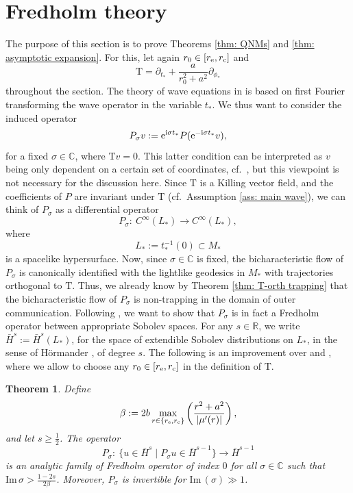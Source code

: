 \documentclass[10pt,a4paper]{amsart}
\renewcommand{\Im}{\mathrm{Im} \,}
\renewcommand{\b}{\beta}
\renewcommand{\d}{\partial}
\newcommand{\abs}[1]{\left\lvert#1\right\rvert}
\newcommand{\T}{\mathrm T}
\newcommand{\s}{\sigma}
\newcommand{\R}[0]{\mathbb{R}}
\newcommand{\C}[0]{\mathbb{C}}
\numberwithin{equation}{section}
\newtheorem{Theorem}{Theorem}[section]
\begin{document}
\section{Fredholm theory}


The purpose of this section is to prove Theorems \ref{thm: QNMs} and \ref{thm: asymptotic expansion}.
For this, let again $r_0 \in [r_{\rm e}, r_{\rm c}]$
and
\[
	\T
		= \d_{t_*} + \frac a{r_0^2 + a^2} \d_{\phi_*}
\]
throughout the section.
The theory of wave equations in \cite{V2013} is based on first Fourier transforming the wave operator in the variable $t_*$.
We thus want to consider the induced operator
\[
	P_\s v
		:= {\rm e}^{{\rm i}\s t_*} P({\rm e}^{-{\rm i} \s t_*} v),
\]
for a fixed $\s \in \C$, where
$\T v
		= 0$.
This latter condition can be interpreted as $v$ being only dependent on a certain set of coordinates, cf.\ \cite[equation~(11)]{PV2023}, but this viewpoint is not necessary for the discussion here.
Since $\T$ is a Killing vector field, and the coefficients of $P$ are invariant under $\T$ (cf.~Assumption \ref{ass: main wave}), we can think of $P_\s$ as a differential operator
\[
	P_\s
		\colon\
 C^\infty(L_*) \to C^\infty(L_*),
\]
where
\[
	L_*
		:= t_*^{-1}(0) \subset M_*
\]
is a spacelike hypersurface.
Now, since $\s \in \C$ is fixed, the bicharacteristic flow of $P_\s$ is canonically identified with the lightlike geodesics in $M_*$ with trajectories orthogonal to $\T$.
Thus, we already know by Theorem \ref{thm: T-orth trapping} that the bicharacteristic flow of $P_\s$ is non-trapping in the domain of outer communication.
Following \cite{V2013}, we want to show that $P_\s$ is in fact a Fredholm operator between appropriate Sobolev spaces.
For any $s \in \R$, we write
$ \bar H^s := \bar H^s(L_*)$,
for the space of extendible Sobolev distributions on $L_*$, in the sense of H\"ormander \cite{HorIII}, of degree $s$.
The following is an improvement over \cite[Lemma~2.1]{PV2023} and \cite[Theorem~1.1]{V2013}, where we allow to choose any $r_0 \in [r_{\rm e}, r_{\rm c}]$ in the definition of $\T$.

\begin{Theorem} \label{thm: Fredholm}
Define
\[
	\b
		:= 2b \max_{r \in \{r_{\rm e}, r_{\rm c}\}} \left( \frac{r^2 + a^2}{\abs{\mu'(r)}} \right),
\]
and let $s \geq \frac12$.
The operator
\[
  P_\s\colon\ \big\{u \in \bar H^s \mid P_\s u \in \bar H^{s-1} \big\} \to \bar H^{s-1}
\]
is an analytic family of Fredholm operator of index $0$ for all $\s \in \C$ such that $\Im \s > \frac{1 - 2s}{2\b}$.
Moreover, $P_\s$ is invertible for $\Im(\s) \gg 1$.
\end{Theorem}
\end{document}
